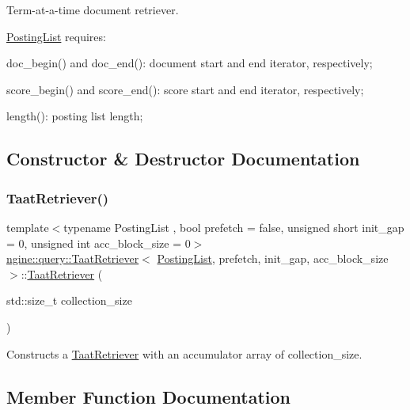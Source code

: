 Term-\/at-\/a-\/time document retriever.

\hyperlink{classngine_1_1PostingList}{Posting\+List} requires\+:
\begin{DoxyItemize}
\item doc\+\_\+begin() and doc\+\_\+end()\+: document start and end iterator, respectively;
\item score\+\_\+begin() and score\+\_\+end()\+: score start and end iterator, respectively;
\item length()\+: posting list length; 
\end{DoxyItemize}

\subsection{Constructor \& Destructor Documentation}
\mbox{\label{classngine_1_1query_1_1TaatRetriever_a7e9f75a28a1af01b28ec37df96c944fe}} 
\subsubsection{\texorpdfstring{Taat\+Retriever()}{TaatRetriever()}}
{\footnotesize\ttfamily template$<$typename Posting\+List , bool prefetch = false, unsigned short init\+\_\+gap = 0, unsigned int acc\+\_\+block\+\_\+size = 0$>$ \\
\hyperlink{classngine_1_1query_1_1TaatRetriever}{ngine\+::query\+::\+Taat\+Retriever}$<$ \hyperlink{classngine_1_1PostingList}{Posting\+List}, prefetch, init\+\_\+gap, acc\+\_\+block\+\_\+size $>$\+::\hyperlink{classngine_1_1query_1_1TaatRetriever}{Taat\+Retriever} (\begin{DoxyParamCaption}\item[{std\+::size\+\_\+t}]{collection\+\_\+size }\end{DoxyParamCaption})\hspace{0.3cm}{\ttfamily [inline]}}



Constructs a \hyperlink{classngine_1_1query_1_1TaatRetriever}{Taat\+Retriever} with an accumulator array of collection\+\_\+size. 



\subsection{Member Function Documentation}
\mbox{\label{classngine_1_1query_1_1TaatRetriever_af2a95fa756403a71243379451ddde620}} 

